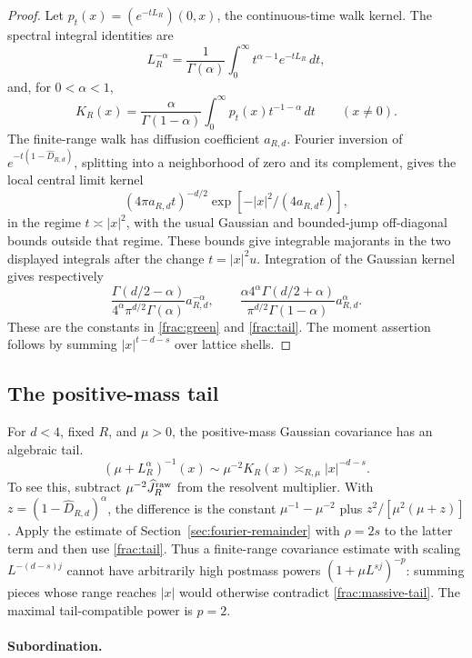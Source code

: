 \documentclass[11pt]{article}
\begin{document}
\begin{proof}
Let \(p_t(x)=(e^{-tL_R})(0,x)\), the continuous-time walk kernel.
The spectral integral identities are
\[
 L_R^{-\alpha}=\frac1{\Gamma(\alpha)}
       \int_0^\infty t^{\alpha-1}e^{-tL_R}\,dt,
\]
and, for \(0<\alpha<1\),
\[
 K_R(x)=\frac{\alpha}{\Gamma(1-\alpha)}
       \int_0^\infty p_t(x)t^{-1-\alpha}\,dt
       \qquad(x\ne0).
\]
The finite-range walk has diffusion coefficient \(a_{R,d}\).
Fourier inversion of \(e^{-t(1-\widehat D_{R,d})}\), splitting
into a neighborhood of zero and its complement, gives the local
central limit kernel
\[
 (4\pi a_{R,d}t)^{-d/2}\exp[-|x|^2/(4a_{R,d}t)],
\]
in the regime \(t\asymp|x|^2\),
with the usual Gaussian and bounded-jump off-diagonal bounds
outside that regime. These bounds give integrable majorants in
the two displayed integrals after the change \(t=|x|^2u\).
Integration of the Gaussian kernel gives respectively
\[
 \frac{\Gamma(d/2-\alpha)}
       {4^\alpha\pi^{d/2}\Gamma(\alpha)}a_{R,d}^{-\alpha},
 \qquad
 \frac{\alpha4^\alpha\Gamma(d/2+\alpha)}
       {\pi^{d/2}\Gamma(1-\alpha)}a_{R,d}^{\alpha}.
\]
These are the constants in \eqref{frac:green} and
\eqref{frac:tail}. The moment assertion follows by summing
\(|x|^{t-d-s}\) over lattice shells.
\end{proof}

\subsection{The positive-mass tail}

For \(d<4\), fixed \(R\), and \(\mu>0\), the positive-mass
Gaussian covariance has an algebraic tail.
\begin{equation}\label{frac:massive-tail}
 (\mu+L_R^\alpha)^{-1}(x)
       \sim \mu^{-2}K_R(x)
       \asymp_{R,\mu}|x|^{-d-s}.
\end{equation}
To see this, subtract \(\mu^{-2}\widehat J_R^{\rm raw}\) from the
resolvent multiplier. With \(z=(1-\widehat D_{R,d})^\alpha\), the
difference is the constant \(\mu^{-1}-\mu^{-2}\) plus
\(z^2/[\mu^2(\mu+z)]\). Apply the estimate of Section~\ref{sec:fourier-remainder} with
\(\rho=2s\) to the latter term and then use \eqref{frac:tail}.
Thus a finite-range covariance estimate with scaling
\(L^{-(d-s)j}\) cannot have arbitrarily high postmass powers
\((1+\mu L^{sj})^{-p}\): summing pieces whose range reaches
\(|x|\) would otherwise contradict \eqref{frac:massive-tail}.
The maximal tail-compatible power is \(p=2\).

\paragraph{Subordination.}
\label{frac:subordination}
\end{document}
